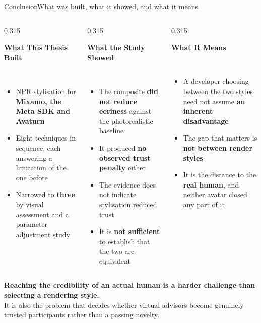 \documentclass[aspectratio=169,10pt]{beamer}
\newcommand{\hl}[1]{{\color{knblue}\textbf{#1}}}
\newcommand{\good}[1]{{\color{kngreen}\textbf{#1}}}
\newcommand{\bad}[1]{{\color{knred}\textbf{#1}}}
\newcommand{\panelhead}[1]{\noindent\colorbox{kncyan}{\parbox{0.96\textwidth}{\centering\vspace{1pt}\color{white}\scriptsize\bfseries #1\vspace{1pt}}}\\[0.25em]}
\newcommand{\panel}[1]{\noindent\colorbox{knlight}{\parbox{0.96\textwidth}{\vspace{2pt}\scriptsize
\begin{itemize}\setlength{\itemsep}{0.2em}\setlength{\leftmargini}{1.1em}#1\end{itemize}\vspace{2pt}}}}
\begin{document}
\begin{frame}{Conclusion}{What was built, what it showed, and what it means}
  \vspace{0.5em}
  \begin{columns}[T]
    \begin{column}{0.315\textwidth}
      \panelhead{What This Thesis Built}
      \panel{%
        \item NPR stylisation for \hl{Mixamo, the Meta SDK and Avaturn}
        \item Eight techniques in sequence, each answering a limitation of the one before
        \item Narrowed to \hl{three} by visual assessment and a parameter adjustment study}
    \end{column}
    \begin{column}{0.315\textwidth}
      \panelhead{What the Study Showed}
      \panel{%
        \item The composite \bad{did not reduce eeriness} against the photorealistic baseline
        \item It produced \good{no observed trust penalty} either
        \item The evidence does not indicate stylisation reduced trust
        \item It is \bad{not sufficient} to establish that the two are equivalent}
    \end{column}
    \begin{column}{0.315\textwidth}
      \panelhead{What It Means}
      \panel{%
        \item A developer choosing between the two styles need not assume \good{an inherent disadvantage}
        \item The gap that matters is \bad{not between render styles}
        \item It is the distance to the \hl{real human}, and neither avatar closed any part of it}
    \end{column}
  \end{columns}
  \vfill
  \noindent\colorbox{knlight}{\parbox{0.975\textwidth}{\centering\color{knblue}\scriptsize
  \textbf{Reaching the credibility of an actual human is a harder challenge than selecting a rendering style.}\\
  It is also the problem that decides whether virtual advisors become genuinely trusted participants rather than a passing novelty.}}
\end{frame}
\end{document}
